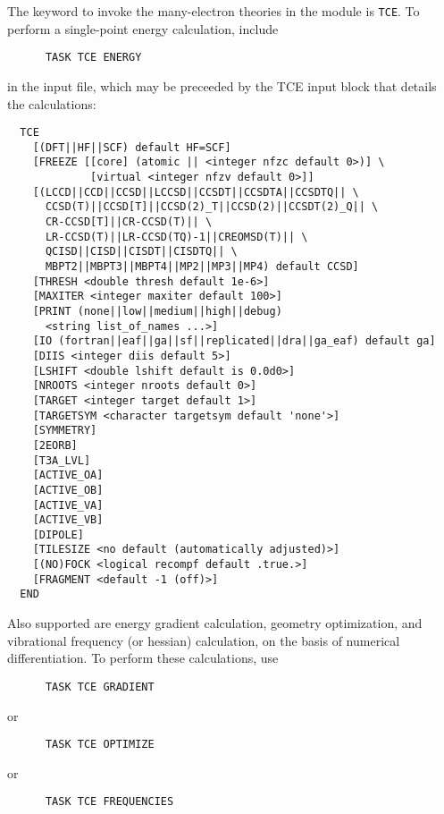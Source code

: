 The keyword to invoke the many-electron theories in the module is
\verb+TCE+.  To perform a single-point energy calculation, include
\begin{verbatim}
      TASK TCE ENERGY
\end{verbatim}
in the input file, which may be preceeded by the TCE input block
that details the calculations:
\begin{verbatim}
  TCE
    [(DFT||HF||SCF) default HF=SCF]
    [FREEZE [[core] (atomic || <integer nfzc default 0>)] \
             [virtual <integer nfzv default 0>]]
    [(LCCD||CCD||CCSD||LCCSD||CCSDT||CCSDTA||CCSDTQ|| \
      CCSD(T)||CCSD[T]||CCSD(2)_T||CCSD(2)||CCSDT(2)_Q|| \
      CR-CCSD[T]||CR-CCSD(T)|| \
      LR-CCSD(T)||LR-CCSD(TQ)-1||CREOMSD(T)|| \
      QCISD||CISD||CISDT||CISDTQ|| \
      MBPT2||MBPT3||MBPT4||MP2||MP3||MP4) default CCSD]
    [THRESH <double thresh default 1e-6>]
    [MAXITER <integer maxiter default 100>]
    [PRINT (none||low||medium||high||debug)
      <string list_of_names ...>]
    [IO (fortran||eaf||ga||sf||replicated||dra||ga_eaf) default ga]
    [DIIS <integer diis default 5>]
    [LSHIFT <double lshift default is 0.0d0>]
    [NROOTS <integer nroots default 0>]
    [TARGET <integer target default 1>]
    [TARGETSYM <character targetsym default 'none'>]
    [SYMMETRY]
    [2EORB]
    [T3A_LVL] 
    [ACTIVE_OA]
    [ACTIVE_OB]
    [ACTIVE_VA]
    [ACTIVE_VB]
    [DIPOLE]
    [TILESIZE <no default (automatically adjusted)>]
    [(NO)FOCK <logical recompf default .true.>]
    [FRAGMENT <default -1 (off)>]
  END
\end{verbatim}
Also supported are energy gradient calculation, geometry optimization,
and vibrational frequency (or hessian) calculation, on the basis of
numerical differentiation.  To perform these calculations, use
\begin{verbatim}
      TASK TCE GRADIENT
\end{verbatim}
or
\begin{verbatim}
      TASK TCE OPTIMIZE
\end{verbatim}
or
\begin{verbatim}
      TASK TCE FREQUENCIES
\end{verbatim}

